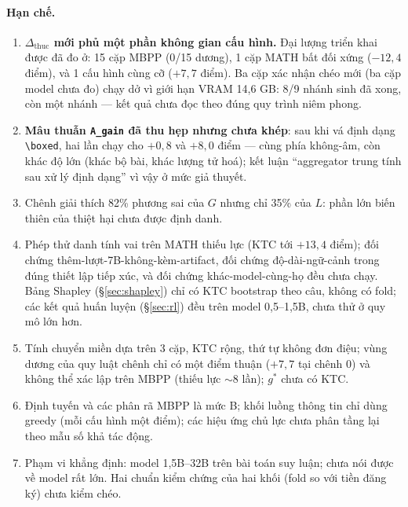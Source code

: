 \documentclass[11pt,a4paper]{article}
\newcommand{\dhonest}{\Delta_{\mathrm{thuc}}}
\begin{document}
\paragraph{Hạn chế.}
\begin{enumerate}\itemsep2pt
\item \textbf{$\dhonest$ mới phủ một phần không gian cấu hình.} Đại lượng triển khai được đã đo
      ở: 15 cặp MBPP (0/15 dương), 1 cặp MATH bất đối xứng ($-12{,}4$ điểm), và 1 cấu hình cùng
      cỡ ($+7{,}7$ điểm). Ba cặp xác nhận chéo mới (ba cặp model chưa đo) chạy dở vì giới hạn VRAM
      14,6 GB: 8/9 nhánh sinh đã xong, còn một nhánh --- kết quả chưa đọc theo đúng quy trình
      niêm phong.
\item \textbf{Mâu thuẫn \texttt{A\_gain} đã thu hẹp nhưng chưa khép}: sau khi vá định dạng
      \verb|\boxed|, hai lần chạy cho $+0{,}8$ và $+8{,}0$ điểm --- cùng phía không-âm, còn
      khác độ lớn (khác bộ bài, khác lượng tử hoá); kết luận ``aggregator trung tính sau xử lý
      định dạng'' vì vậy ở mức giả thuyết.
\item Chênh giải thích 82\% phương sai của $G$ nhưng chỉ 35\% của $L$: phần lớn biến thiên của
      thiệt hại chưa được định danh.
\item Phép thử danh tính vai trên MATH thiếu lực (KTC tới $+13{,}4$ điểm); đối chứng
      thêm-lượt-7B-không-kèm-artifact, đối chứng độ-dài-ngữ-cảnh trong đúng thiết lập tiếp
      xúc, và đối chứng khác-model-cùng-họ đều chưa chạy. Bảng Shapley
      (\S\ref{sec:shapley}) chỉ có KTC bootstrap theo câu, không có fold; các kết quả huấn
      luyện (\S\ref{sec:rl}) đều trên model 0,5--1,5B, chưa thử ở quy mô lớn hơn.
\item Tính chuyển miền dựa trên 3 cặp, KTC rộng, thứ tự không đơn điệu; vùng dương của quy
      luật chênh chỉ có một điểm thuận ($+7{,}7$ tại chênh 0) và không thể xác lập trên MBPP
      (thiếu lực $\sim$8 lần); $g^\ast$ chưa có KTC.
\item Định tuyến và các phân rã MBPP là mức B; khối luồng thông tin chỉ dùng greedy (mỗi cấu
      hình một điểm); các hiệu ứng chủ lực chưa phân tầng lại theo mẫu số khả tác động.
\item Phạm vi khẳng định: model 1,5B--32B trên bài toán suy luận; chưa nói được về model rất
      lớn. Hai chuẩn kiểm chứng của hai khối (fold so với tiền đăng ký) chưa kiểm chéo.
\end{enumerate}
\end{document}
